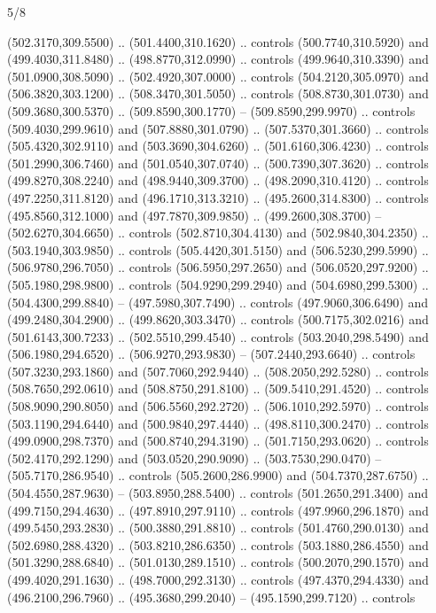 \begin{flagdescription}{5/8}
\begin{scope}[xshift=0.5\flaglength,yshift=0.5\flagwidth,scale=\flagwidth/475.63]
\begin{scope}[y=0.8pt, x=0.8pt, yscale=-1, xscale=1,shift={(-450,-300)}]
\begin{scope}[cm={{1.0,0.0,0.0,1.0,(-0.0002,0.12556)}},cm={{1.0,0.0,0.0,1.0,(0.00179,0.0)}}]
  (502.3170,309.5500) .. (501.4400,310.1620) .. controls (500.7740,310.5920) and
  (499.4030,311.8480) .. (498.8770,312.0990) .. controls (499.9640,310.3390) and
  (501.0900,308.5090) .. (502.4920,307.0000) .. controls (504.2120,305.0970) and
  (506.3820,303.1200) .. (508.3470,301.5050) .. controls (508.8730,301.0730) and
  (509.3680,300.5370) .. (509.8590,300.1770) -- (509.8590,299.9970) .. controls
  (509.4030,299.9610) and (507.8880,301.0790) .. (507.5370,301.3660) .. controls
  (505.4320,302.9110) and (503.3690,304.6260) .. (501.6160,306.4230) .. controls
  (501.2990,306.7460) and (501.0540,307.0740) .. (500.7390,307.3620) .. controls
  (499.8270,308.2240) and (498.9440,309.3700) .. (498.2090,310.4120) .. controls
  (497.2250,311.8120) and (496.1710,313.3210) .. (495.2600,314.8300) .. controls
  (495.8560,312.1000) and (497.7870,309.9850) .. (499.2600,308.3700) --
  (502.6270,304.6650) .. controls (502.8710,304.4130) and (502.9840,304.2350) ..
  (503.1940,303.9850) .. controls (505.4420,301.5150) and (506.5230,299.5990) ..
  (506.9780,296.7050) .. controls (506.5950,297.2650) and (506.0520,297.9200) ..
  (505.1980,298.9800) .. controls (504.9290,299.2940) and (504.6980,299.5300) ..
  (504.4300,299.8840) -- (497.5980,307.7490) .. controls (497.9060,306.6490) and
  (499.2480,304.2900) .. (499.8620,303.3470) .. controls (500.7175,302.0216) and
  (501.6143,300.7233) .. (502.5510,299.4540) .. controls (503.2040,298.5490) and
  (506.1980,294.6520) .. (506.9270,293.9830) -- (507.2440,293.6640) .. controls
  (507.3230,293.1860) and (507.7060,292.9440) .. (508.2050,292.5280) .. controls
  (508.7650,292.0610) and (508.8750,291.8100) .. (509.5410,291.4520) .. controls
  (508.9090,290.8050) and (506.5560,292.2720) .. (506.1010,292.5970) .. controls
  (503.1190,294.6440) and (500.9840,297.4440) .. (498.8110,300.2470) .. controls
  (499.0900,298.7370) and (500.8740,294.3190) .. (501.7150,293.0620) .. controls
  (502.4170,292.1290) and (503.0520,290.9090) .. (503.7530,290.0470) --
  (505.7170,286.9540) .. controls (505.2600,286.9900) and (504.7370,287.6750) ..
  (504.4550,287.9630) -- (503.8950,288.5400) .. controls (501.2650,291.3400) and
  (499.7150,294.4630) .. (497.8910,297.9110) .. controls (497.9960,296.1870) and
  (499.5450,293.2830) .. (500.3880,291.8810) .. controls (501.4760,290.0130) and
  (502.6980,288.4320) .. (503.8210,286.6350) .. controls (503.1880,286.4550) and
  (501.3290,288.6840) .. (501.0130,289.1510) .. controls (500.2070,290.1570) and
  (499.4020,291.1630) .. (498.7000,292.3130) .. controls (497.4370,294.4330) and
  (496.2100,296.7960) .. (495.3680,299.2040) -- (495.1590,299.7120) .. controls

\end{scope}
\end{scope}
\end{scope}
\end{flagdescription}
